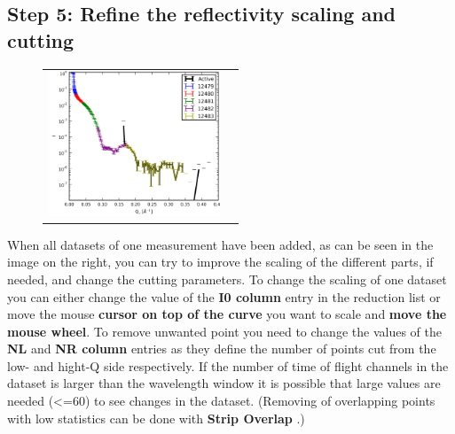   \subsection{Step 5: Refine the reflectivity scaling and cutting}
  \label{sec:scaling}
    \begin{figure}
    \centering
    \begin{tabular}{cc}
     \includegraphics[width=145pt]{screenshots/cleanpoints.png} 
    \end{tabular}
    \end{figure}
    When all datasets of one measurement have been added, as can be seen in the image on the right, you can try to improve the scaling of the different parts, if needed, and change the cutting parameters.
    To change the scaling of one dataset you can either change the value of the \textbf{I0 column} entry in the reduction list or move the mouse \textbf{cursor on top of the curve} you want to scale and \textbf{move the mouse wheel}.
    To remove unwanted point you need to change the values of the \textbf{NL} and \textbf{NR column} entries as they define the number of points cut from the low- and hight-Q side respectively.
    If the number of time of flight channels in the dataset is larger than the wavelength window it is possible that large values are needed (<=60) to see changes in the dataset. 
    (Removing of overlapping points with low statistics can be done with \textbf{Strip Overlap} .)
    
